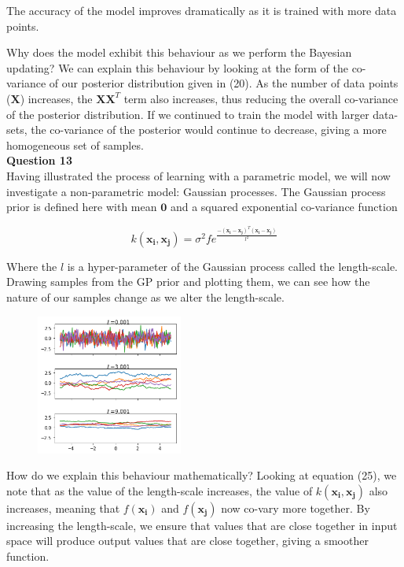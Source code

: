 \documentclass[10pt, a4paper, twocolumn]{article} %
\begin{document}
\begin{enumerate}
The accuracy of the model improves dramatically as it is trained with more data points.

Why does the model exhibit this behaviour as we perform the Bayesian updating? We can explain this behaviour by looking at the form of the co-variance of our posterior distribution given in (20). As the number of data points ($\mathbf{X}$) increases, the $\mathbf{XX}^T$ term also increases, thus reducing the overall co-variance of the posterior distribution. If we continued to train the model with larger data-sets, the co-variance of the posterior would continue to decrease, giving a more homogeneous set of samples.\\   

\textbf{Question 13}\\
   Having illustrated the process of learning with a parametric model, we will now investigate a non-parametric model: Gaussian processes. The Gaussian process prior is defined here with mean $\mathbf{0}$ and a squared exponential co-variance function
  
  \begin{equation}
      k(\mathbf{x_i},\mathbf{x_j}) = \sigma^{2}fe^\frac{-(\mathbf{x_i}-\mathbf{x_j})^T(\mathbf{x_i}-\mathbf{x_j})}{l^{2}}
  \end{equation}
  
  Where the $l$ is a hyper-parameter of the Gaussian process called the length-scale. Drawing samples from the GP prior and plotting them, we can see how the nature of our samples change as we alter the length-scale.
  
  \begin{figure}[H]
      \centering
      \includegraphics[width = 0.43\textwidth]{images/nonparametricprior.png}
      \caption{}
      \label{fig:Q13_non-parametric_prior}
  \end{figure}
  
  How do we explain this behaviour mathematically? Looking at equation (25), we note that as the value of the length-scale increases, the value of $k(\mathbf{x_i},\mathbf{x_j})$ also increases, meaning that $f(\mathbf{x_i})$ and $f(\mathbf{x_j})$ now co-vary more together. By increasing the length-scale, we ensure that values that are close together in input space will produce output values that are close together, giving a smoother function.
  

\end{enumerate}
\end{document}
